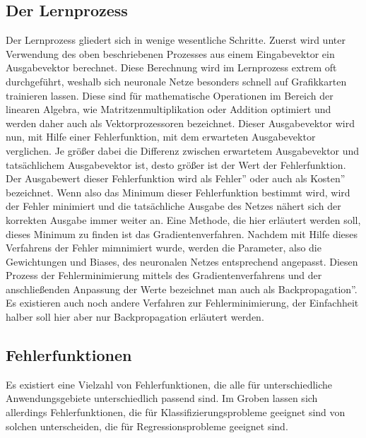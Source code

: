 \documentclass{article}
\begin{document}
\subsection{Der Lernprozess}
Der Lernprozess gliedert sich in wenige wesentliche Schritte. Zuerst wird unter Verwendung des oben beschriebenen Prozesses aus einem Eingabevektor ein Ausgabevektor berechnet. Diese Berechnung wird im Lernprozess extrem oft durchgeführt, weshalb sich neuronale Netze besonders schnell auf Grafikkarten trainieren lassen. Diese sind für mathematische Operationen im Bereich der linearen Algebra, wie Matritzenmultiplikation oder Addition optimiert und werden daher auch als Vektorprozessoren bezeichnet.\newline
Dieser Ausgabevektor wird nun, mit Hilfe einer Fehlerfunktion, mit dem erwarteten Ausgabevektor verglichen. Je größer dabei die Differenz zwischen erwartetem Ausgabevektor und tatsächlichem Ausgabevektor ist, desto größer ist der Wert der Fehlerfunktion. Der Ausgabewert dieser Fehlerfunktion wird als \glqq Fehler'' oder auch als \glqq Kosten'' bezeichnet. Wenn also das Minimum dieser Fehlerfunktion bestimmt wird, wird der Fehler minimiert und die tatsächliche Ausgabe des Netzes nähert sich der korrekten Ausgabe immer weiter an.\newline
Eine Methode, die hier erläutert werden soll, dieses Minimum zu finden ist das Gradientenverfahren. Nachdem mit Hilfe dieses Verfahrens der Fehler mimnimiert wurde, werden die Parameter, also die Gewichtungen und Biases, des neuronalen Netzes entsprechend angepasst. Diesen Prozess der Fehlerminimierung mittels des Gradientenverfahrens und der anschließenden Anpassung der Werte bezeichnet man auch als \glqq Backpropagation''. Es existieren auch noch andere Verfahren zur Fehlerminimierung, der Einfachheit halber soll hier aber nur Backpropagation erläutert werden.
\subsection{Fehlerfunktionen}
Es existiert eine Vielzahl von Fehlerfunktionen, die alle für unterschiedliche Anwendungsgebiete unterschiedlich passend sind. Im Groben lassen sich allerdings Fehlerfunktionen, die für Klassifizierungsprobleme geeignet sind von solchen unterscheiden, die für Regressionsprobleme geeignet sind.
\end{document}

